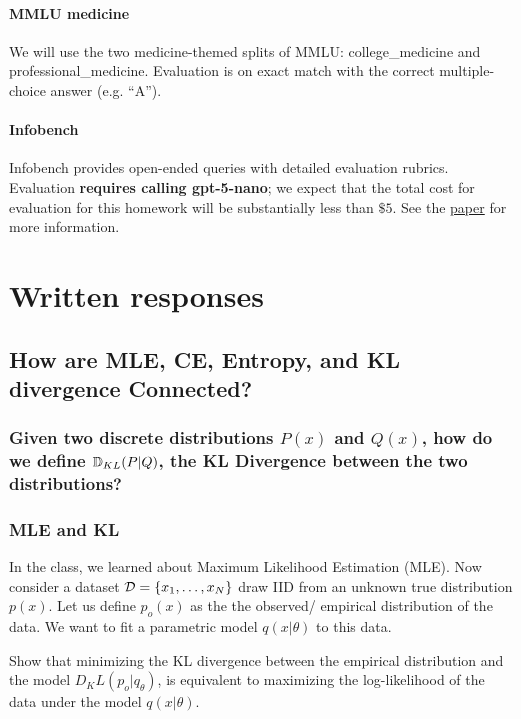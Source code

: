 \documentclass{article}
\begin{document}
\paragraph{MMLU medicine} 

We will use the two medicine-themed splits of MMLU: college\_medicine and professional\_medicine. Evaluation is on exact match with the correct multiple-choice answer (e.g. ``A''). 
\paragraph{Infobench} 

Infobench provides open-ended queries with detailed evaluation rubrics. Evaluation \textbf{requires calling gpt-5-nano}; we expect that the total cost for evaluation for this homework will be substantially less than $\$5$. See the \href{https://arxiv.org/abs/2401.03601}{paper} for more information.

\section{Written responses}

\subsection{How are MLE, CE, Entropy, and KL divergence Connected?}
\subsubsection{Given two discrete distributions $P(x)$ and $Q(x)$, how do we define $\mathbb{D}_{KL}(P|Q)$, the KL Divergence between the two distributions?}

\begin{solve}
\end{solve}

\subsubsection{MLE and KL}

In the class, we learned about Maximum Likelihood Estimation (MLE). Now consider a dataset $\mathcal{D}=\{x_1, \dots, x_N\}$ draw IID from an unknown true distribution $p(x)$. Let us define $p_{o}(x)$ as the the observed/ empirical distribution of the data. We want to fit a parametric model $q(x|\theta)$ to this data.

Show that minimizing the KL divergence between the empirical distribution and the model $D_KL(p_o|q_\theta)$, is equivalent to maximizing the log-likelihood of the data under the model $q(x|\theta)$.
\begin{solve}

\end{solve}
\end{document}
